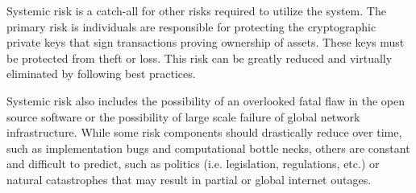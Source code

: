 Systemic risk is a catch-all for other risks required to utilize the system.
The primary risk is individuals are responsible for protecting the
cryptographic private keys that sign transactions proving ownership of assets.
These keys must be protected from theft or loss. This risk can be greatly
reduced and virtually eliminated by following best practices.


Systemic risk also includes the possibility of an overlooked fatal flaw in the
open source software or the possibility of large scale failure of global
network infrastructure. While some risk components should drastically reduce
over time, such as implementation bugs and computational bottle necks, others
are constant and difficult to predict, such as politics (i.e. legislation,
regulations, etc.) or natural catastrophes that may result in partial or global
internet outages.
